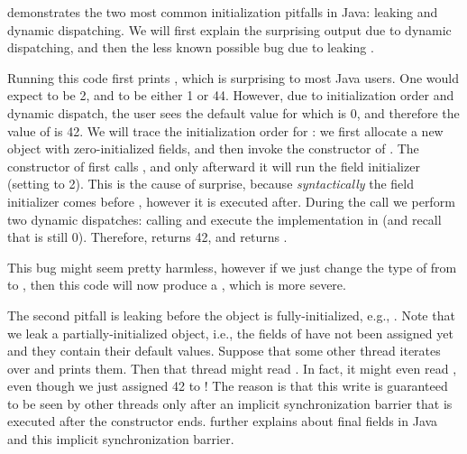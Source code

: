  demonstrates the two most common initialization pitfalls in Java:
    leaking \this and dynamic dispatching.
We will first explain the surprising output due to dynamic dispatching,
    and then the less known possible bug due to leaking \this.

Running this code first prints , which is
    surprising to most Java users.
One would expect  to be 2, and  to be either 1 or 44.
However, due to initialization order and dynamic dispatch,
    the user sees the default value for  which is 0,
    and therefore the value of  is 42.
We will trace the initialization order for :
    we first allocate a new object with zero-initialized fields,
    and then invoke the constructor of .
The constructor of  first calls ,
    and only afterward it will run the field initializer (setting  to 2).
This is the cause of surprise, because \emph{syntactically} the field initializer comes before
    ,
    however it is executed after.
During the  call we perform two dynamic dispatches:
    calling  and 
    execute the implementation in  (and recall that  is still 0).
Therefore,  returns 42, and  returns .

This bug might seem pretty harmless,
    however if we just change the type of  from  to ,
    then this code will now produce a ,
    which is more severe.

The second pitfall is leaking \this before the object is fully-initialized,
    e.g., .
Note that we leak a partially-initialized object, i.e.,
    the fields of  have not been assigned yet and they contain their default values.
Suppose that some other thread iterates over  and prints them.
Then that thread might read .
In fact, it might even read , even though we just assigned 42 to !
The reason is that this write is guaranteed to be seen by other threads only
    after an implicit synchronization barrier that is executed after the constructor ends.
 further explains about final fields in Java and this implicit synchronization barrier.



